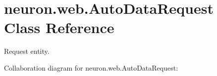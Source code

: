 \hypertarget{classneuron_1_1web_1_1AutoDataRequest}{}\section{neuron.\+web.\+Auto\+Data\+Request Class Reference}
\label{classneuron_1_1web_1_1AutoDataRequest}


Request entity.  




Collaboration diagram for neuron.\+web.\+Auto\+Data\+Request\+:
